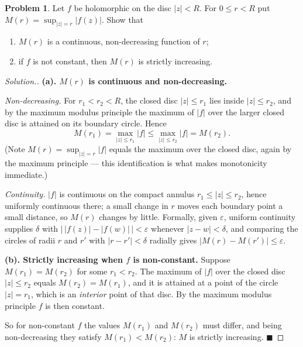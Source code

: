 \documentclass[11pt,a4paper]{article}
\theoremstyle{definition}
\newtheorem{problemx}{Problem}[section]
\newenvironment{problem}{\begin{problemx}}{\end{problemx}}
\newenvironment{solution}
  {\renewcommand{\qedsymbol}{}\begin{proof}[\textit{Solution}.]}
  {\end{proof}}
\begin{document}
\begin{problem}
Let $f$ be holomorphic on the disc $\left|z\right| < R$. For $0 \leq r < R$ put
$M(r) = \sup_{\left|z\right| = r}\left|f(z)\right|$. Show that
\begin{enumerate}
\item[(a).] $M(r)$ is a continuous, non-decreasing function of $r$;
\item[(b).] if $f$ is not constant, then $M(r)$ is strictly increasing.
\end{enumerate}
\end{problem}

\begin{solution}
\textbf{(a). $M(r)$ is continuous and non-decreasing.}

\emph{Non-decreasing.} For $r_1 < r_2 < R$, the closed disc
$\left|z\right| \leq r_1$ lies inside $\left|z\right| \leq r_2$, and by the maximum
modulus principle the maximum of $\left|f\right|$ over the larger closed disc is
attained on its boundary circle. Hence
$$M(r_1) = \max_{\left|z\right|\leq r_1}\left|f\right|
\leq \max_{\left|z\right|\leq r_2}\left|f\right| = M(r_2).$$
(Note $M(r) = \sup_{\left|z\right|=r}\left|f\right|$ equals the maximum over the
closed disc, again by the maximum principle --- this identification is what makes
monotonicity immediate.)

\emph{Continuity.} $\left|f\right|$ is continuous on the compact annulus
$r_1 \leq \left|z\right| \leq r_2$, hence uniformly continuous there; a small
change in $r$ moves each boundary point a small distance, so $M(r)$ changes by
little. Formally, given $\varepsilon$, uniform continuity supplies $\delta$ with
$\left|\,\left|f(z)\right|-\left|f(w)\right|\,\right| < \varepsilon$ whenever
$\left|z-w\right| < \delta$, and comparing the circles of radii $r$ and $r'$ with
$\left|r-r'\right| < \delta$ radially gives
$\left|M(r)-M(r')\right| \leq \varepsilon$.

\textbf{(b). Strictly increasing when $f$ is non-constant.} Suppose
$M(r_1) = M(r_2)$ for some $r_1 < r_2$. The maximum of $\left|f\right|$ over the
closed disc $\left|z\right| \leq r_2$ equals $M(r_2) = M(r_1)$, and it is attained
at a point of the circle $\left|z\right| = r_1$, which is an \emph{interior} point
of that disc. By the maximum modulus principle $f$ is then constant.

So for non-constant $f$ the values $M(r_1)$ and $M(r_2)$ must differ, and being
non-decreasing they satisfy $M(r_1) < M(r_2)$: $M$ is strictly increasing.
$\blacksquare$
\end{solution}
\end{document}
